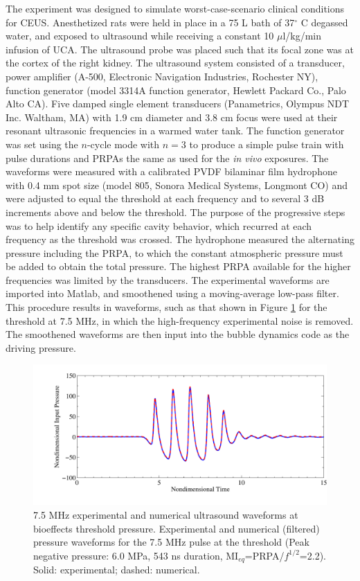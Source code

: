 The experiment was designed to simulate worst-case-scenario clinical
conditions for CEUS. Anesthetized rats were held in place in a 75 L
bath of 37$ ^\circ$ C degassed water, and exposed to ultrasound while
receiving a constant 10 $\mu$l/kg/min infusion of UCA.  The ultrasound
probe was placed such that its focal zone was at the cortex of the
right kidney.  The ultrasound system consisted of a transducer, power
amplifier (A-500, Electronic Navigation Industries, Rochester NY),
function generator (model 3314A function generator, Hewlett Packard
Co., Palo Alto CA).  Five damped single element transducers
(Panametrics, Olympus NDT Inc. Waltham, MA) with 1.9 cm diameter and
3.8 cm focus were used at their resonant ultrasonic frequencies in a
warmed water tank.  The function generator was set using the $n$-cycle
mode with $n=3$ to produce a simple pulse train with pulse durations
and PRPAs the same as used for the \textit{in vivo} exposures.  The
waveforms were measured with a calibrated PVDF bilaminar film
hydrophone with 0.4 mm spot size (model 805, Sonora Medical Systems,
Longmont CO) and were adjusted to equal the threshold at each
frequency and to several 3 dB increments above and below the
threshold.  The purpose of the progressive steps was to help identify
any specific cavity behavior, which recurred at each frequency as the
threshold was crossed.  The hydrophone measured the alternating
pressure including the PRPA, to which the constant atmospheric
pressure must be added to obtain the total pressure.  The highest PRPA
available for the higher frequencies was limited by the transducers.
The experimental waveforms are imported into Matlab, and smoothened
using a moving-average low-pass filter. This procedure results in
waveforms, such as that shown in Figure \ref{fig:waveforms} for the
threshold at 7.5 MHz, in which the high-frequency experimental noise
is removed. The smoothened waveforms are then input into the bubble
dynamics code as the driving pressure.

\begin{figure}[!t]
  \centering \includegraphics[width=\textwidth]{./figs/bubble_figs/PexpPsmooth}
  \caption[7.5 MHz experimental and numerical ultrasound waveforms at
  bioeffects threshold pressure]{7.5 MHz experimental and numerical
    ultrasound waveforms at bioeffects threshold
    pressure. Experimental and numerical (filtered) pressure waveforms
    for the 7.5 MHz pulse at the threshold (Peak negative pressure:
    6.0 MPa, 543 ns duration, MI$_{eq}$=PRPA/$f^{1/2}$=2.2). Solid:
    experimental; dashed: numerical.}
  \label{fig:waveforms}
\end{figure}


